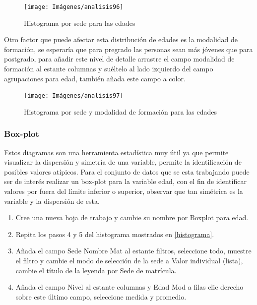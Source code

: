 \documentclass[
]{book}
\begin{document}
\begin{figure}

{\centering \texttt{[image: Imágenes/analisis96]} 

}

\caption{Histograma por sede para las edades}\label{fig:histogramafiltrosede-fig}
\end{figure}

Otro factor que puede afectar esta distribución de edades es la modalidad de formación, se esperaría que para pregrado las personas sean más jóvenes que para postgrado, para añadir este nivel de detalle arrastre el campo modalidad de formación al estante columnas y suéltelo al lado izquierdo del campo agrupaciones para edad, también añada este campo a color.

\begin{figure}

{\centering \texttt{[image: Imágenes/analisis97]} 

}

\caption{Histograma por sede y modalidad de formación para las edades}\label{fig:histogramafiltrosedemodalidad-fig}
\end{figure}

\hypertarget{boxplot}{%
\subsubsection{Box-plot}\label{boxplot}}

Estos diagramas son una herramienta estadística muy útil ya que permite visualizar la dispersión y simetría de una variable, permite la identificación de posibles valores atípicos. Para el conjunto de datos que se esta trabajando puede ser de interés realizar un box-plot para la variable edad, con el fin de identificar valores por fuera del límite inferior o superior, observar que tan simétrica es la variable y la dispersión de esta.

\begin{enumerate}
\def\labelenumi{\arabic{enumi}.}
\item
  Cree una nueva hoja de trabajo y cambie su nombre por Boxplot para edad.
\item
  Repita los pasos 4 y 5 del histograma mostrados en \ref{histograma}.
\item
  Añada el campo Sede Nombre Mat al estante filtros, seleccione todo, muestre el filtro y cambie el modo de selección de la sede a Valor individual (lista), cambie el título de la leyenda por Sede de matrícula.
\item
  Añada el campo Nivel al estante columnas y Edad Mod a filas clic derecho sobre este último campo, seleccione medida y promedio.
\end{enumerate}
\end{document}
